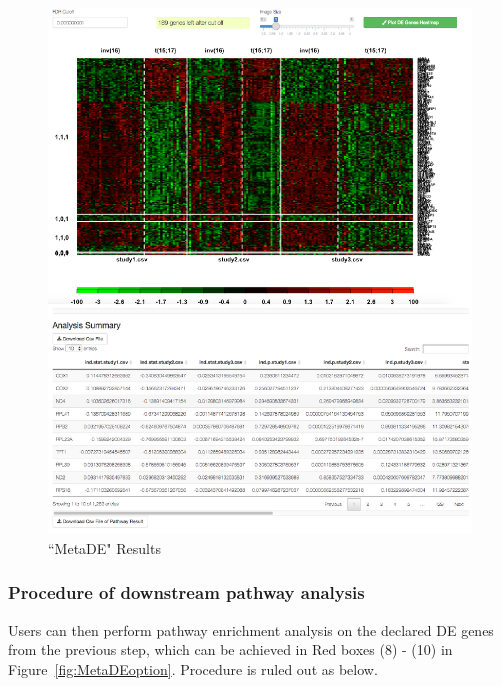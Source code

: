 \begin{figure}[H]
\begin{center}
\includegraphics[scale=0.9]{./figure/metaDE/metaDEresult.pdf}
\caption{``MetaDE" Results}
\label{fig:MetaDEresult1}
\end{center}
\end{figure}

\subsubsection{Procedure of downstream pathway analysis}
Users can then perform pathway enrichment analysis on the declared DE genes from the previous step, 
which can be achieved in {\color{red} Red boxes (8) - (10)} in Figure~\ref{fig:MetaDEoption}.
Procedure is ruled out as below.

